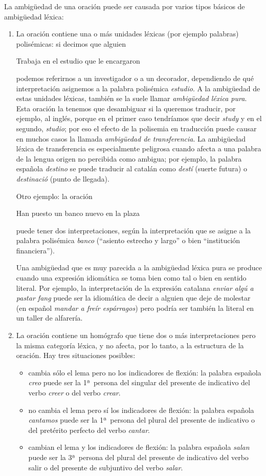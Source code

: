 La ambigüedad de una oración puede ser causada por varios tipos básicos de ambigüedad léxica: \begin{enumerate} \item La oración contiene una o más unidades léxicas (por ejemplo palabras) polisémicas: si decimos que alguien \begin{exemple} Trabaja en el estudio que le encargaron \end{exemple} podemos referirnos a un investigador o a un decorador, dependiendo de qué interpretación asignemos a la palabra polisémica \emph{estudio}. A la ambigüedad de estas unidades léxicas, también se la suele llamar {\em ambigüedad léxica pura}. Esta oración la tenemos que desambiguar si la queremos traducir, por ejemplo, al inglés, porque en el primer caso tendríamos que decir \emph{study} y en el segundo, \emph{studio}; por eso el efecto de la polisemia en traducción puede causar en muchos casos la llamada {\em ambigüedad de transferencia}. La ambigüedad léxica de transferencia es especialmente peligrosa cuando afecta a una palabra de la lengua origen no percibida como ambigua; por ejemplo, la palabra española \emph{destino} se puede traducir al catalán como {\em destí} (suerte futura) o \emph{destinació} (punto de llegada). 

Otro ejemplo: la oración \begin{exemple} Han puesto un banco nuevo en la plaza \end{exemple} puede tener dos interpretaciones, según la interpretación que se asigne a la palabra polisémica \emph{banco} (``asiento estrecho y largo'' o bien ``institución financiera''). 

Una ambigüedad que es muy parecida a la ambigüedad léxica pura se produce cuando una expresión idiomática se toma bien como tal o bien en sentido literal. Por ejemplo, la interpretación de la expresión catalana \emph{enviar algú a pastar fang} puede ser la idiomática de decir a alguien que deje de molestar (en español \emph{mandar a freír espárragos}) pero podría ser también la literal en un taller de alfarería. 

\item La oración contiene un homógrafo que tiene dos o más interpretaciones pero la misma categoría léxica, y no afecta, por lo tanto, a la estructura de la oración. Hay tres situaciones posibles: \begin{itemize} \item cambia sólo el lema pero no los indicadores de flexión: la palabra española \emph{creo} puede ser la 1ª\ persona del singular del presente de indicativo del verbo \emph{creer} o del verbo \emph{crear}. \item no cambia el lema pero sí los indicadores de flexión: la palabra española \emph{cantamos} puede ser la 1ª\ persona del plural del presente de indicativo o del pretérito perfecto del verbo \emph{cantar}. \item cambian el lema y los indicadores de flexión: la palabra española \emph{salan} puede ser la 3ª\ persona del plural del presente de indicativo del verbo salir o del presente de subjuntivo del verbo \emph{salar}. \end{itemize} 


\end{enumerate}
